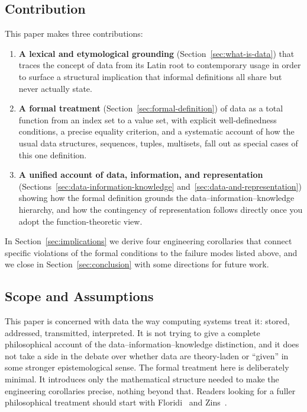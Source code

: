 \subsection{Contribution}

This paper makes three contributions:

\begin{enumerate}
  \item \textbf{A lexical and etymological grounding} (Section~\ref{sec:what-is-data})
        that traces the concept of data from its Latin root to contemporary
        usage in order to surface a structural implication that informal
        definitions all share but never actually state.
  \item \textbf{A formal treatment} (Section~\ref{sec:formal-definition}) of
        data as a total function from an index set to a value set, with
        explicit well-definedness conditions, a precise equality criterion,
        and a systematic account of how the usual data structures, sequences,
        tuples, multisets, fall out as special cases of this one definition.
  \item \textbf{A unified account of data, information, and representation}
        (Sections~\ref{sec:data-information-knowledge}
        and~\ref{sec:data-and-representation}) showing how the formal
        definition grounds the data--information--knowledge hierarchy, and how
        the contingency of representation follows directly once you adopt the
        function-theoretic view.
\end{enumerate}

In Section~\ref{sec:implications} we derive four engineering corollaries that
connect specific violations of the formal conditions to the failure modes
listed above, and we close in Section~\ref{sec:conclusion} with some
directions for future work.

\subsection{Scope and Assumptions}

This paper is concerned with data the way computing systems treat it: stored,
addressed, transmitted, interpreted. It is not trying to give a complete
philosophical account of the data--information--knowledge distinction, and it
does not take a side in the debate over whether data are theory-laden or
``given'' in some stronger epistemological sense. The formal treatment here is
deliberately minimal. It introduces only the mathematical structure needed to
make the engineering corollaries precise, nothing beyond that. Readers looking
for a fuller philosophical treatment should start with
Floridi~\autocite{floridi2010} and Zins~\autocite{zins2007}.
